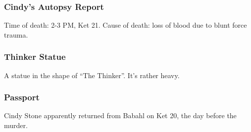 \subsubsection{Cindy's Autopsy Report}
Time of death: 2-3 PM, Ket 21. Cause of death: loss of blood due to blunt force trauma. 


\subsubsection{Thinker Statue}
A statue in the shape of ``The Thinker''. It's rather heavy.

\subsubsection{Passport}
Cindy Stone apparently returned from Babahl on Ket 20, the day before the murder.